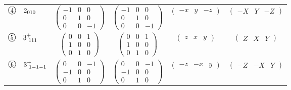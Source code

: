 \documentclass[fleqn,10pt,landscape]{jsarticle}
\begin{document}
\begin{center}
\begin{longtable}{lcccc}
$ {\ooalign{\hfil\resizebox{.8\width}{\height}{4}\hfil\crcr\raise.1ex\hbox{\large$\bigcirc$}}}\quad 2{}_{010} $ & $ \begin{pmatrix} -1 & 0 & 0 \\ 0 & 1 & 0 \\ 0 & 0 & -1 \end{pmatrix} $ & $ \begin{pmatrix} -1 & 0 & 0 \\ 0 & 1 & 0 \\ 0 & 0 & -1 \end{pmatrix} $ & $ \begin{pmatrix} - x & y & - z \end{pmatrix} $ & $ \begin{pmatrix} - X & Y & - Z \end{pmatrix} $ \\
$ {\ooalign{\hfil\resizebox{.8\width}{\height}{5}\hfil\crcr\raise.1ex\hbox{\large$\bigcirc$}}}\quad 3^{+}_{\,\,111} $ & $ \begin{pmatrix} 0 & 0 & 1 \\ 1 & 0 & 0 \\ 0 & 1 & 0 \end{pmatrix} $ & $ \begin{pmatrix} 0 & 0 & 1 \\ 1 & 0 & 0 \\ 0 & 1 & 0 \end{pmatrix} $ & $ \begin{pmatrix} z & x & y \end{pmatrix} $ & $ \begin{pmatrix} Z & X & Y \end{pmatrix} $ \\
$ {\ooalign{\hfil\resizebox{.8\width}{\height}{6}\hfil\crcr\raise.1ex\hbox{\large$\bigcirc$}}}\quad 3^{+}_{\,\,1-1-1} $ & $ \begin{pmatrix} 0 & 0 & -1 \\ -1 & 0 & 0 \\ 0 & 1 & 0 \end{pmatrix} $ & $ \begin{pmatrix} 0 & 0 & -1 \\ -1 & 0 & 0 \\ 0 & 1 & 0 \end{pmatrix} $ & $ \begin{pmatrix} - z & - x & y \end{pmatrix} $ & $ \begin{pmatrix} - Z & - X & Y \end{pmatrix} $ \\

\end{longtable}
\end{center}
\end{document}
